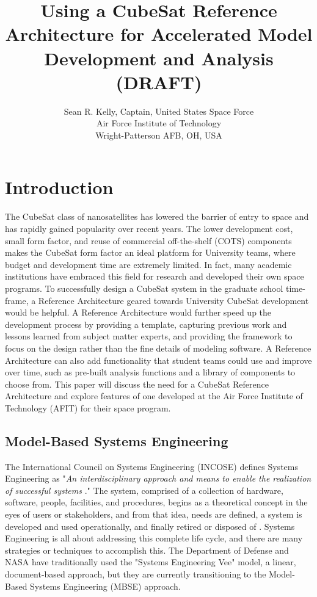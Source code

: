 \documentclass[conference]{joss-pretty}
\title{Using a CubeSat Reference Architecture for Accelerated Model Development and Analysis (DRAFT)}
\author{
Sean R. Kelly, Captain, United States Space Force \\
Air Force Institute of Technology\\
Wright-Patterson AFB, OH, USA
}
\begin{document}
\maketitle

\section{Introduction}
The CubeSat class of nanosatellites has lowered the barrier of entry to space and has rapidly gained popularity over recent years. The lower development cost, small form factor, and reuse of commercial off-the-shelf (COTS) components makes the CubeSat form factor an ideal platform for University teams, where budget and development time are extremely limited. In fact, many academic institutions have embraced this field for research and developed their own space programs. To successfully design a CubeSat system  in the graduate school time-frame, a Reference Architecture geared towards University CubeSat development would be helpful. A Reference Architecture would further speed up the development process by providing a template, capturing previous work and lessons learned from subject matter experts, and providing the framework to focus on the design rather than the fine details of modeling software. A Reference Architecture can also add functionality that student teams could use and improve over time, such as pre-built analysis functions and a library of components to choose from. This paper will discuss the need for a CubeSat Reference Architecture and explore features of one developed at the Air Force Institute of Technology (AFIT) for their space program. 

\subsection{Model-Based Systems Engineering}
The International Council on Systems Engineering (INCOSE) defines Systems Engineering as "\textit{An interdisciplinary approach and means to enable the realization of successful systems} \citep{INCOSEhandbook}." The system, comprised of a collection of hardware, software, people, facilities, and procedures, begins as a theoretical concept in the eyes of users or stakeholders, and from that idea, needs are defined, a system is developed and used operationally, and finally retired or disposed of \citep{Buede2016}. Systems Engineering is all about addressing this complete life cycle, and there are many strategies or techniques to accomplish this. The Department of Defense and NASA have traditionally used the "Systems Engineering Vee" model, a linear, document-based approach, but they are currently transitioning to the Model-Based Systems Engineering (MBSE) approach. 
\end{document}

